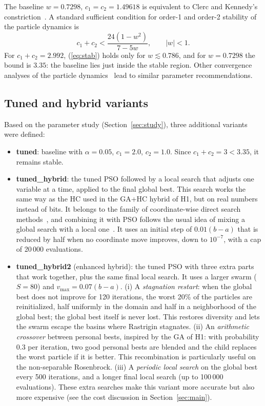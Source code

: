 \documentclass[conference]{IEEEtran}
\begin{document}
The baseline $w=0.7298$, $c_1=c_2=1.49618$ is equivalent to Clerc and
Kennedy's constriction~\cite{clerc2002,eberhart2000,shi1998param}. A
standard sufficient condition for order-1 and order-2 stability of the
particle dynamics is~\cite{poli2009}
\begin{equation}
c_1+c_2 < \frac{24(1-w^2)}{7-5w},\qquad |w|<1.\label{eq:stab}
\end{equation}
For $c_1+c_2=2.992$, (\ref{eq:stab}) holds only for $w\lesssim0.786$, and
for $w=0.7298$ the bound is $3.35$: the baseline lies just inside the
stable region. Other convergence analyses of the particle
dynamics~\cite{trelea2003,vandenbergh2006} lead to similar parameter
recommendations.

\subsection{Tuned and hybrid variants}
Based on the parameter study (Section~\ref{sec:study}), three additional
variants were defined:
\begin{itemize}
\item \textbf{tuned}: baseline with $\alpha=0.05$, $c_1=2.0$, $c_2=1.0$.
Since $c_1+c_2=3<3.35$, it remains stable.
\item \textbf{tuned\_hybrid}: the tuned PSO followed by a local search that
adjusts one variable at a time, applied to the final global best. This
search works the same way as the HC used in the GA+HC hybrid of H1, but on
real numbers instead of bits. It belongs to the family of coordinate-wise
direct search methods~\cite{hooke1961}, and combining it with PSO follows
the usual idea of mixing a global search with a local one~\cite{talbi2002}.
It uses an initial step of $0.01(b-a)$ that is reduced by half when no
coordinate move improves, down to $10^{-7}$, with a cap of 20\,000
evaluations.
\item \textbf{tuned\_hybrid2} (enhanced hybrid): the tuned PSO with three
extra parts that work together, plus the same final local search. It uses a
larger swarm ($S=80$) and $v_{\max}=0.07(b-a)$. (i) A \emph{stagnation
restart}: when the global best does not improve for 120 iterations, the
worst 20\% of the particles are reinitialized, half uniformly in the domain
and half in a neighborhood of the global best; the global best itself is
never lost. This restores diversity and lets the swarm escape the basins
where Rastrigin stagnates. (ii) An \emph{arithmetic crossover} between
personal bests, inspired by the GA of H1: with probability $0.3$ per
iteration, two good personal bests are blended and the child replaces the
worst particle if it is better. This recombination is particularly useful
on the non-separable Rosenbrock. (iii) A \emph{periodic local search} on the
global best every 500 iterations, and a longer final local search (up to
100\,000 evaluations). These extra searches make this variant more accurate
but also more expensive (see the cost discussion in
Section~\ref{sec:main}).
\end{itemize}
\end{document}

